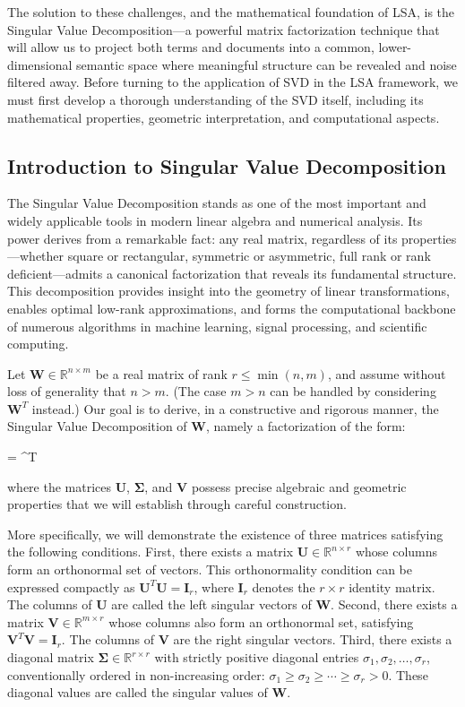 The solution to these challenges, and the mathematical foundation of LSA, is the Singular Value Decomposition—a powerful matrix factorization technique that will allow us to project both terms and documents into a common, lower-dimensional semantic space where meaningful structure can be revealed and noise filtered away. Before turning to the application of SVD in the LSA framework, we must first develop a thorough understanding of the SVD itself, including its mathematical properties, geometric interpretation, and computational aspects.

\subsection*{Introduction to Singular Value Decomposition}

The Singular Value Decomposition stands as one of the most important and widely applicable tools in modern linear algebra and numerical analysis. Its power derives from a remarkable fact: any real matrix, regardless of its properties—whether square or rectangular, symmetric or asymmetric, full rank or rank deficient—admits a canonical factorization that reveals its fundamental structure. This decomposition provides insight into the geometry of linear transformations, enables optimal low-rank approximations, and forms the computational backbone of numerous algorithms in machine learning, signal processing, and scientific computing.

Let $\mathbf{W} \in \mathbb{R}^{n \times m}$ be a real matrix of rank $r \leq \min(n,m)$, and assume without loss of generality that $n > m$. (The case $m > n$ can be handled by considering $\mathbf{W}^T$ instead.) Our goal is to derive, in a constructive and rigorous manner, the Singular Value Decomposition of $\mathbf{W}$, namely a factorization of the form:
\begin{myequation}
 =  \boldsymbol{\Sigma} ^T
\end{myequation}
where the matrices $\mathbf{U}$, $\boldsymbol{\Sigma}$, and $\mathbf{V}$ possess precise algebraic and geometric properties that we will establish through careful construction.

More specifically, we will demonstrate the existence of three matrices satisfying the following conditions. First, there exists a matrix $\mathbf{U} \in \mathbb{R}^{n \times r}$ whose columns form an orthonormal set of vectors. This orthonormality condition can be expressed compactly as $\mathbf{U}^T \mathbf{U} = \mathbf{I}_r$, where $\mathbf{I}_r$ denotes the $r \times r$ identity matrix. The columns of $\mathbf{U}$ are called the left singular vectors of $\mathbf{W}$. Second, there exists a matrix $\mathbf{V} \in \mathbb{R}^{m \times r}$ whose columns also form an orthonormal set, satisfying $\mathbf{V}^T \mathbf{V} = \mathbf{I}_r$. The columns of $\mathbf{V}$ are the right singular vectors. Third, there exists a diagonal matrix $\boldsymbol{\Sigma} \in \mathbb{R}^{r \times r}$ with strictly positive diagonal entries $\sigma_1, \sigma_2, \ldots, \sigma_r$, conventionally ordered in non-increasing order: $\sigma_1 \geq \sigma_2 \geq \cdots \geq \sigma_r > 0$. These diagonal values are called the singular values of $\mathbf{W}$.

